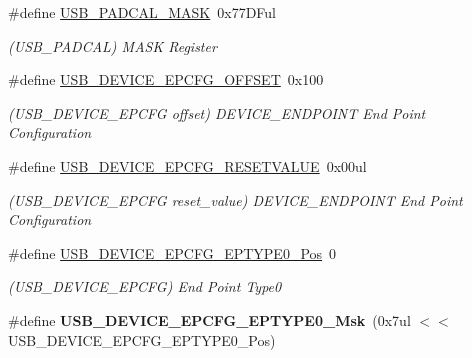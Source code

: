 \begin{DoxyCompactItemize}
\item 
\hypertarget{group___s_a_m_l21___u_s_b_gaca59b8f0e9981bca2d5e7c6fa280149c}{}\#define \hyperlink{group___s_a_m_l21___u_s_b_gaca59b8f0e9981bca2d5e7c6fa280149c}{U\+S\+B\+\_\+\+P\+A\+D\+C\+A\+L\+\_\+\+M\+A\+S\+K}~0x77\+D\+Ful\label{group___s_a_m_l21___u_s_b_gaca59b8f0e9981bca2d5e7c6fa280149c}

\begin{DoxyCompactList}\small\item\em (U\+S\+B\+\_\+\+P\+A\+D\+C\+A\+L) M\+A\+S\+K Register \end{DoxyCompactList}\item 
\hypertarget{group___s_a_m_l21___u_s_b_ga9b0c23ce6c53d2d843bf55d2577b832e}{}\#define \hyperlink{group___s_a_m_l21___u_s_b_ga9b0c23ce6c53d2d843bf55d2577b832e}{U\+S\+B\+\_\+\+D\+E\+V\+I\+C\+E\+\_\+\+E\+P\+C\+F\+G\+\_\+\+O\+F\+F\+S\+E\+T}~0x100\label{group___s_a_m_l21___u_s_b_ga9b0c23ce6c53d2d843bf55d2577b832e}

\begin{DoxyCompactList}\small\item\em (U\+S\+B\+\_\+\+D\+E\+V\+I\+C\+E\+\_\+\+E\+P\+C\+F\+G offset) D\+E\+V\+I\+C\+E\+\_\+\+E\+N\+D\+P\+O\+I\+N\+T End Point Configuration \end{DoxyCompactList}\item 
\hypertarget{group___s_a_m_l21___u_s_b_ga038064f19c709c8375d5f31b6750192d}{}\#define \hyperlink{group___s_a_m_l21___u_s_b_ga038064f19c709c8375d5f31b6750192d}{U\+S\+B\+\_\+\+D\+E\+V\+I\+C\+E\+\_\+\+E\+P\+C\+F\+G\+\_\+\+R\+E\+S\+E\+T\+V\+A\+L\+U\+E}~0x00ul\label{group___s_a_m_l21___u_s_b_ga038064f19c709c8375d5f31b6750192d}

\begin{DoxyCompactList}\small\item\em (U\+S\+B\+\_\+\+D\+E\+V\+I\+C\+E\+\_\+\+E\+P\+C\+F\+G reset\+\_\+value) D\+E\+V\+I\+C\+E\+\_\+\+E\+N\+D\+P\+O\+I\+N\+T End Point Configuration \end{DoxyCompactList}\item 
\hypertarget{group___s_a_m_l21___u_s_b_ga28367740a0b3944537370790bebe7fa1}{}\#define \hyperlink{group___s_a_m_l21___u_s_b_ga28367740a0b3944537370790bebe7fa1}{U\+S\+B\+\_\+\+D\+E\+V\+I\+C\+E\+\_\+\+E\+P\+C\+F\+G\+\_\+\+E\+P\+T\+Y\+P\+E0\+\_\+\+Pos}~0\label{group___s_a_m_l21___u_s_b_ga28367740a0b3944537370790bebe7fa1}

\begin{DoxyCompactList}\small\item\em (U\+S\+B\+\_\+\+D\+E\+V\+I\+C\+E\+\_\+\+E\+P\+C\+F\+G) End Point Type0 \end{DoxyCompactList}\item 
\hypertarget{group___s_a_m_l21___u_s_b_gacb3350753b42e9a19c16935c60b91cd9}{}\#define {\bfseries U\+S\+B\+\_\+\+D\+E\+V\+I\+C\+E\+\_\+\+E\+P\+C\+F\+G\+\_\+\+E\+P\+T\+Y\+P\+E0\+\_\+\+Msk}~(0x7ul $<$$<$ U\+S\+B\+\_\+\+D\+E\+V\+I\+C\+E\+\_\+\+E\+P\+C\+F\+G\+\_\+\+E\+P\+T\+Y\+P\+E0\+\_\+\+Pos)\label{group___s_a_m_l21___u_s_b_gacb3350753b42e9a19c16935c60b91cd9}


\end{DoxyCompactItemize}
